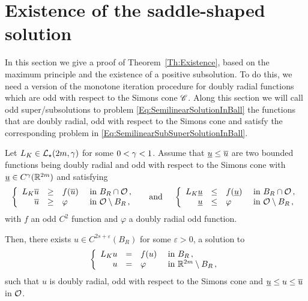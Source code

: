 \section{Existence of the saddle-shaped solution}
\label{Sec:Existence}


In this section we give a proof of Theorem~\ref{Th:Existence}, based on the maximum principle and the existence of a positive subsolution. To do this, we need a version of the monotone iteration procedure for doubly radial functions which are odd with respect to the Simons cone $\mathscr{C}$. Along this section we will call odd super/subsolutions to problem \eqref{Eq:SemilinearSolutionInBall} the functions that are doubly radial, odd with respect to the Simons cone and satisfy the corresponding problem in \eqref{Eq:SemilinearSubSuperSolutionInBall}.

\begin{proposition}
	\label{Prop:MonotoneIterationOdd}
	Let $L_K\in \mathcal{L}_\star(2m,\gamma)$ for some $0<\gamma<1$. Assume that $\underline{u} \leq \overline{u}$ are two bounded functions being doubly radial and odd with respect to the Simons cone with $\underline{u}\in C^\gamma(\mathbb{R}^{2m})$ and satisfying   
	\begin{equation}
	\label{Eq:SemilinearSubSuperSolutionInBall}
	\left\{\begin{array}{rcll}
	L_K\overline{u} & \geq & f(\overline{u}) & \textrm{ in } B_R \cap \mathcal{O}\,, \\
	\overline{u} & \geq & \varphi & \textrm{ in } \mathcal{O} \setminus B_R\,, 
	\end{array} \right.
	\quad \textrm{ and } \quad 
	\left\{\begin{array}{rcll}
	L_K\underline{u} & \leq & f(\underline{u}) & \textrm{ in } B_R \cap \mathcal{O}\,, \\
	\underline{u} & \leq & \varphi & \textrm{ in } \mathcal{O} \setminus B_R\,, 
	\end{array} \right.
	\end{equation}
	with $f$ an odd $C^2$ function and $\varphi$ a doubly radial odd function.
	
	Then, there exists $u\in C^{2s+\varepsilon}(B_R)$ for some $\varepsilon>0$, a solution to
	\begin{equation}
	\label{Eq:SemilinearSolutionInBall}
	\left\{\begin{array}{rcll}
	L_K u & = & f(u) & \textrm{ in } B_R\,, \\
	u &=& \varphi &  \textrm{ in } \mathbb{R}^{2m} \setminus B_R\,, 
	\end{array} \right.
	\end{equation}
	such that $u$ is doubly radial, odd with respect to the Simons cone and  $\underline{u} \leq u \leq \overline{u}$ in $\mathcal{O}$.
\end{proposition}


